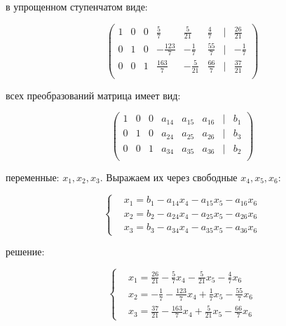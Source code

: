 \documentclass{report}
\begin{document}
\begin{itemize}
\begin{enumerate}
\begin{itemize}
			\end{itemize}
			
		\end{enumerate}
		
		\newpage
		
		 в упрощенном ступенчатом виде:
		
		
		\begin{center}
			\Large{
				\[
				\begin{pmatrix}
					1 & 0 & 0 & \frac{5}{7} & \frac{5}{21} & \frac{4}{7} & | & \frac{26}{21} \\
					0 & 1 & 0 & -\frac{123}{7} & -\frac{1}{7} & \frac{55}{7} & | & -\frac{1}{7} \\
					0 & 0 & 1 & \frac{163}{7} & -\frac{5}{21} & \frac{66}{7} & | & \frac{37}{21} \\
				\end{pmatrix}
				\]
			}
		\end{center}
		
		 всех преобразований матрица имеет вид:
		
		\begin{center}
			\Large{
				\[
				\begin{pmatrix}
					1 & 0 & 0 & a_{14} & a_{15} & a_{16} & | & b_{1} \\
					0 & 1 & 0 & a_{24} & a_{25} & a_{26} & | & b_{3} \\
					0 & 0 & 1 & a_{34} & a_{35} & a_{36} & | & b_{2} \\
				\end{pmatrix}
				\]
			}
		\end{center}
		
		
		 переменные: $x_1, x_2, x_3$. Выражаем их через свободные $x_4, x_5, x_6$:
		
		\[
		\left\{
		\begin{aligned}
			&x_1 = b_1 - a_{14}x_4 - a_{15}x_5 - a_{16}x_6 \\
			&x_2 = b_2 - a_{24}x_4 - a_{25}x_5 - a_{26}x_6 \\
			&x_3 = b_3 - a_{34}x_4 - a_{35}x_5 - a_{36}x_6
		\end{aligned}
		\right.
		\]
		
		
		 решение:
		
		\[
		\left\{
		\begin{aligned}
			&x_1 = \frac{26}{21} - \frac{5}{7}x_4 - \frac{5}{21}x_5 - \frac{4}{7}x_6 \\
			&x_2 = -\frac{1}{7} - \frac{123}{7}x_4 + \frac{1}{7}x_5 - \frac{55}{7}x_6 \\
			&x_3 = \frac{37}{21} - \frac{163}{7}x_4 + \frac{5}{21}x_5 - \frac{66}{7}x_6
		\end{aligned}
		\right.
		\]
		
	\end{itemize}
	
\end{document}
